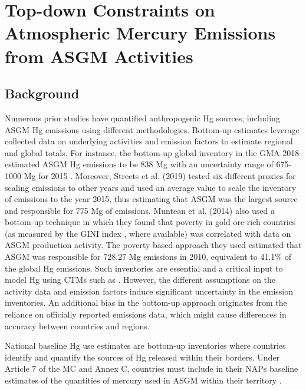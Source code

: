 \chapter{Top-down Constraints on Atmospheric Mercury Emissions from ASGM Activities}
\section{Background}
\begin{flushleft}


 Numerous prior studies have quantified anthropogenic Hg sources, including ASGM Hg emissions using different methodologies. Bottom-up estimates leverage collected data on underlying activities and emission factors to estimate regional and global totals. For instance, the bottom-up global inventory in the GMA 2018 estimated ASGM Hg emissions to be 838 Mg with an uncertainty range of 675-1000 Mg for 2015 \cite{united_nations_environment_programme_technical_2019,steenhuisen_development_2019}. Moreover, Streets et al. (2019) tested six different proxies for scaling emissions to other years and used an average value to scale the inventory of emissions to the year 2015, thus estimating that ASGM was the largest source and responsible for 775 Mg of emissions\cite{streets_global_2019}. Muntean et al. (2014) also used a bottom-up technique in which they found that poverty in gold ore-rich countries (as measured by the GINI index \cite{sadefo_kamdem_nice_2012}, where available) was correlated with data on ASGM production activity. The poverty-based approach they used estimated that ASGM was responsible for 728.27 Mg emissions in 2010, equivalent to 41.1\% of the global Hg emissions\cite{muntean_evaluating_2018}. Such inventories are essential and a critical input to model Hg using CTMs such as \gc. However, the different assumptions on the activity data and emission factors induce significant uncertainty in the emission inventories. An additional bias in the bottom-up approach originates from the reliance on officially reported emissions data, which might cause differences in accuracy between countries and regions. 
 \end{flushleft}
 \begin{flushleft}
    National baseline Hg use estimates are bottom-up inventories where countries identify and quantify the sources of Hg released within their borders. Under Article 7 of the MC and Annex C, countries must include in their NAPs baseline estimates of the quantities of mercury used in ASGM within their territory \cite{united_nations_environment_programme_estimating_2017}.  
 \end{flushleft}
 



